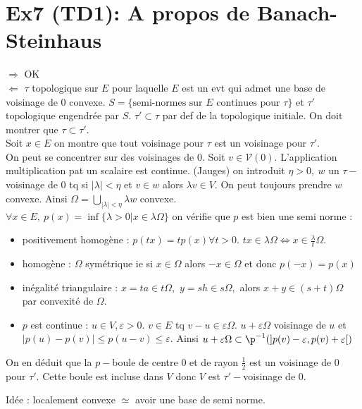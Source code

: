 \documentclass[a4paper]{article}
\begin{document}
\section*{Ex7 (TD1): A propos de Banach-Steinhaus}
    $\Rightarrow $ OK\\
        $\Leftarrow$ $\tau$ topologique sur $E$ pour laquelle $E$ est un evt qui admet une base de voisinage de 0 convexe. $S=\{\text{semi-normes sur $E$ continues pour }\tau\} $ et $\tau'$ topologique engendrée par $S.$ $\tau'\subset \tau$ par def de la topologique initiale. On doit montrer que $\tau\subset \tau'.$ \\
        Soit $x\in E$ on montre que tout voisinage pour $\tau$ est un voisinage pour $\tau'.$ \\
        On peut se concentrer sur des voisinages de $0.$ Soit $v\in \mathcal{V}(0)$.  L'application multiplication pat un scalaire est continue. (Jauges) on introduit $\eta>0,\ w$ un $\tau-$voisinage de 0 tq si $|\lambda|<\eta$ et $v\in w$ alors $\lambda v\in V$. On peut toujours prendre $w$ convexe. Ainsi $\Omega=\bigcup\limits_{|\lambda|<\eta} \lambda w$ convexe.\\
        $\forall x\in E,\ p(x)=\inf \{\lambda>0| x\in \lambda \Omega\}  $ on vérifie que $p$ est bien une semi norme :
        \begin{itemize}
            \item positivement homogène : $p(tx)=tp(x)\forall t>0 $. $tx\in \lambda\Omega\Leftrightarrow x\in \frac{\lambda}{t}\Omega$.
            \item homogène : $\Omega$ symétrique ie si $x\in \Omega$ alors $-x\in \Omega$ et donc $p(-x)= p(x)$ 
            \item inégalité triangulaire : $x=ta\in t\Omega,$ $y=sh\in s\Omega,$ alors $x+y\in (s+t)\Omega$ par convexité de $\Omega.$ 
            \item $p$ est continue : $u\in V,\varepsilon >0.$ $v\in E$ tq $v-u\in \varepsilon \Omega.$ $u+\varepsilon \Omega$ voisinage de $u$ et $|p(u)-p(v)|\le p(u-v)\le \varepsilon .$ Ainsi  $u+\varepsilon \Omega\subset \p^{-1} (]p(v)-\varepsilon ,p(v)+\varepsilon [)$ 
        \end{itemize}
        On en déduit que la $p-$boule de centre 0 et de rayon $\frac{1}{2}$ est un voisinage de 0 pour $\tau'.$ Cette boule est incluse dans $V$ donc $V$ est $\tau'-$voisinage de 0.

Idée : localement convexe $\simeq $ avoir une base de semi norme.
\end{document}
